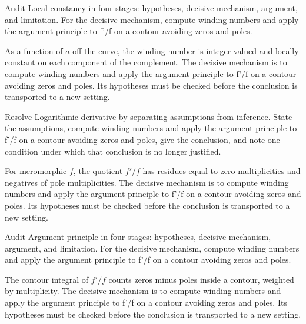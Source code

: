 \begin{problem}\label{prob:iv12-problem-03}
Audit Local constancy in four stages: hypotheses, decisive mechanism, argument, and limitation. For the decisive mechanism, compute winding numbers and apply the argument principle to f'/f on a contour avoiding zeros and poles.
\end{problem}
\begin{solution}
As a function of $a$ off the curve, the winding number is integer-valued and locally constant on each component of the complement. The decisive mechanism is to compute winding numbers and apply the argument principle to f'/f on a contour avoiding zeros and poles. Its hypotheses must be checked before the conclusion is transported to a new setting.
\end{solution}

\begin{problem}\label{prob:iv12-problem-04}
Resolve Logarithmic derivative by separating assumptions from inference. State the assumptions, compute winding numbers and apply the argument principle to f'/f on a contour avoiding zeros and poles, give the conclusion, and note one condition under which that conclusion is no longer justified.
\end{problem}
\begin{solution}
For meromorphic $f$, the quotient $f'/f$ has residues equal to zero multiplicities and negatives of pole multiplicities. The decisive mechanism is to compute winding numbers and apply the argument principle to f'/f on a contour avoiding zeros and poles. Its hypotheses must be checked before the conclusion is transported to a new setting.
\end{solution}

\begin{problem}\label{prob:iv12-problem-05}
Audit Argument principle in four stages: hypotheses, decisive mechanism, argument, and limitation. For the decisive mechanism, compute winding numbers and apply the argument principle to f'/f on a contour avoiding zeros and poles.
\end{problem}
\begin{solution}
The contour integral of $f'/f$ counts zeros minus poles inside a contour, weighted by multiplicity. The decisive mechanism is to compute winding numbers and apply the argument principle to f'/f on a contour avoiding zeros and poles. Its hypotheses must be checked before the conclusion is transported to a new setting.
\end{solution}

